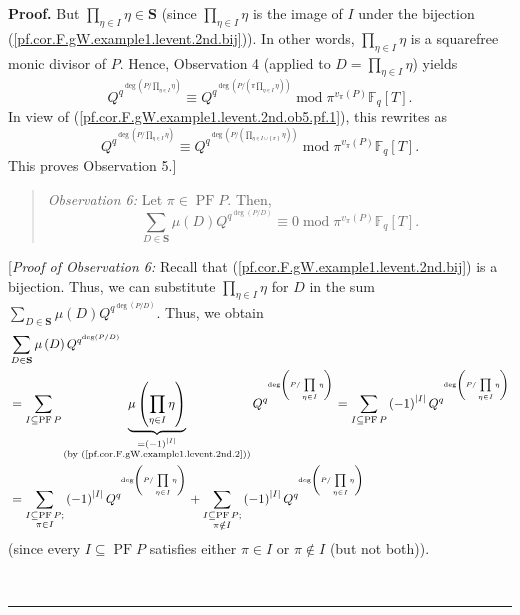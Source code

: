 \documentclass[numbers=enddot,12pt,final,onecolumn,notitlepage]{scrartcl}%
\theoremstyle{definition}
\newenvironment{statement}{\begin{quote}}{\end{quote}}
\newenvironment{proof}[1][Proof]{\noindent\textbf{#1.} }{\ \rule{0.5em}{0.5em}}
\let\sumnonlimits\sum
\let\prodnonlimits\prod
\renewcommand{\sum}{\sumnonlimits\limits}
\renewcommand{\prod}{\prodnonlimits\limits}
\begin{document}
\begin{proof}
But $\prod_{\eta\in I}\eta\in\mathbf{S}$ (since $\prod_{\eta\in I}\eta$ is the
image of $I$ under the bijection (\ref{pf.cor.F.gW.example1.levent.2nd.bij})).
In other words, $\prod_{\eta\in I}\eta$ is a squarefree monic divisor of $P$.
Hence, Observation 4 (applied to $D=\prod_{\eta\in I}\eta$) yields
\[
Q^{q^{\deg\left(  P/\prod_{\eta\in I}\eta\right)  }}\equiv Q^{q^{\deg\left(
P/\left(  \pi\prod_{\eta\in I}\eta\right)  \right)  }}\operatorname{mod}%
\pi^{v_{\pi}\left(  P\right)  }\mathbb{F}_{q}\left[  T\right]  .
\]
In view of (\ref{pf.cor.F.gW.example1.levent.2nd.ob5.pf.1}), this rewrites as%
\[
Q^{q^{\deg\left(  P/\prod_{\eta\in I}\eta\right)  }}\equiv Q^{q^{\deg\left(
P/\left(  \prod_{\eta\in I\cup\left\{  \pi\right\}  }\eta\right)  \right)  }%
}\operatorname{mod}\pi^{v_{\pi}\left(  P\right)  }\mathbb{F}_{q}\left[
T\right]  .
\]
This proves Observation 5.]

\begin{statement}
\textit{Observation 6:} Let $\pi\in\operatorname*{PF}P$. Then,
\[
\sum_{D\in\mathbf{S}}\mu\left(  D\right)  Q^{q^{\deg\left(  P/D\right)  }%
}\equiv0\operatorname{mod}\pi^{v_{\pi}\left(  P\right)  }\mathbb{F}_{q}\left[
T\right]  .
\]

\end{statement}

[\textit{Proof of Observation 6:} Recall that
(\ref{pf.cor.F.gW.example1.levent.2nd.bij}) is a bijection. Thus, we can
substitute $\prod_{\eta\in I}\eta$ for $D$ in the sum $\sum_{D\in\mathbf{S}%
}\mu\left(  D\right)  Q^{q^{\deg\left(  P/D\right)  }}$. Thus, we obtain%
\begin{align}
&  \sum_{D\in\mathbf{S}}\mu\left(  D\right)  Q^{q^{\deg\left(  P/D\right)  }%
}\nonumber\\
&  =\sum_{I\subseteq\operatorname*{PF}P}\underbrace{\mu\left(  \prod_{\eta\in
I}\eta\right)  }_{\substack{=\left(  -1\right)  ^{\left\vert I\right\vert
}\\\text{(by (\ref{pf.cor.F.gW.example1.levent.2nd.2}))}}}Q^{q^{\deg\left(
P/\prod_{\eta\in I}\eta\right)  }}=\sum_{I\subseteq\operatorname*{PF}P}\left(
-1\right)  ^{\left\vert I\right\vert }Q^{q^{\deg\left(  P/\prod_{\eta\in
I}\eta\right)  }}\nonumber\\
&  =\sum_{\substack{I\subseteq\operatorname*{PF}P;\\\pi\in I}}\left(
-1\right)  ^{\left\vert I\right\vert }Q^{q^{\deg\left(  P/\prod_{\eta\in
I}\eta\right)  }}+\sum_{\substack{I\subseteq\operatorname*{PF}P;\\\pi\notin
I}}\left(  -1\right)  ^{\left\vert I\right\vert }Q^{q^{\deg\left(
P/\prod_{\eta\in I}\eta\right)  }}
\label{pf.cor.F.gW.example1.levent.2nd.obs6.pf.1}%
\end{align}
(since every $I\subseteq\operatorname*{PF}P$ satisfies either $\pi\in I$ or
$\pi\notin I$ (but not both)).


\end{proof}
\end{document}
